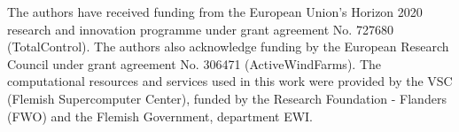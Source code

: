 \documentclass[wes, manuscript]{copernicus}
\begin{document}



\begin{acknowledgements}
The authors have received funding from the European Union's Horizon 2020 research and innovation programme under grant agreement No. 727680 (TotalControl). The authors also acknowledge funding by the European Research Council under grant agreement No. 306471 (ActiveWindFarms). The computational resources and services used in this work were provided by the VSC (Flemish Supercomputer Center), funded by the Research Foundation - Flanders (FWO) and the Flemish Government, department EWI.
\end{acknowledgements}




%
%
%






\end{document}
